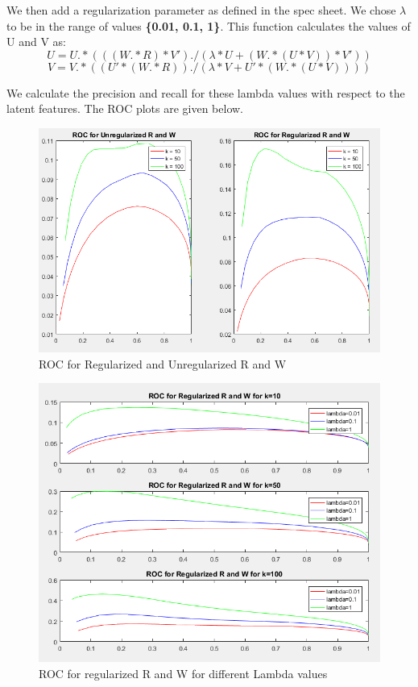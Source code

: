 \documentclass[12pt, onecolumn]{IEEEtran}
\begin{document}
We then add a regularization parameter as defined in the spec sheet. We chose $\lambda$ to be in the range of values \textbf{\{0.01, 0.1, 1\}}.  This function calculates the values of U and V as:
\begin{equation}
U = U.* (((W.* R) * V')./(\lambda * U + (W .* (U * V)) * V'))
\end{equation}
\begin{equation}
V = V.* ((U' * (W .* R))./(\lambda * V + U' * ( W.* (U * V))))
\end{equation}

We calculate the precision and recall for these lambda values with respect to the latent features. The ROC plots are given below.

\begin{figure}[h]
\centering
\captionsetup{justification=centering}
\includegraphics[scale=0.9]{Graphs/ROC1}
\caption{ROC for Regularized and Unregularized R and W}
\end{figure}

\begin{figure}[h]
\centering
\captionsetup{justification=centering}
\includegraphics[scale=0.65]{Graphs/ROCregularized}
\caption{ROC for regularized R and W for different Lambda values}
\end{figure}
\end{document}
